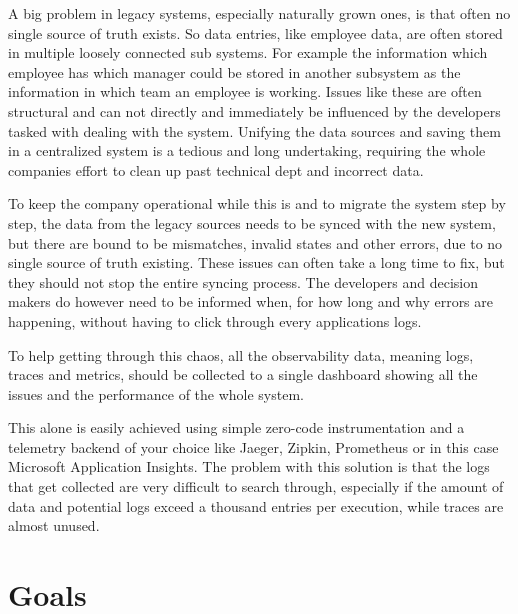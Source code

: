 
A big problem in legacy systems, especially naturally grown ones, is that often no single source of truth exists.
So data entries, like employee data, are often stored in multiple loosely connected sub systems.
For example the information which employee has which manager could be stored in another subsystem
as the information in which team an employee is working. Issues like these are often structural
and can not directly and immediately be influenced by the developers tasked with dealing with the system.
Unifying the data sources and saving them in a centralized system is a tedious and long undertaking,
requiring the whole companies effort to clean up past technical dept and incorrect data.

To keep the company operational while this is and to migrate the system step by step, 
the data from the legacy sources needs to be synced with the new system, but there are bound to be mismatches, 
invalid states and other errors, due to no single source of truth existing.
These issues can often take a long time to fix, but they should not stop the entire syncing process.
The developers and decision makers do however need to be informed when, for how long and why errors are happening,
without having to click through every applications logs.

To help getting through this chaos, all the observability data, meaning logs, traces and metrics, should be
collected to a single dashboard showing all the issues and the performance of the whole system.

This alone is easily achieved using simple zero-code instrumentation and a telemetry backend of your choice
like Jaeger, Zipkin, Prometheus or in this case Microsoft Application Insights. The problem with this solution
is that the logs that get collected are very difficult to search through, especially if the amount of data and
potential logs exceed a thousand entries per execution, while traces are almost unused.

\section{Goals}


